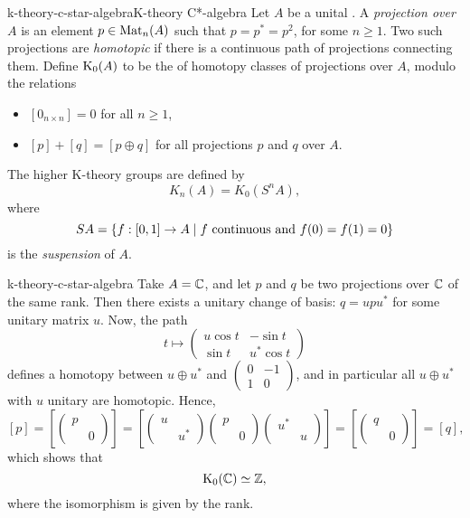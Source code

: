 \begin{topic}{k-theory-c-star-algebra}{K-theory C*-algebra}
    Let $A$ be a unital . A \textit{projection over $A$} is an element $p \in \textup{Mat}_n(A)$ such that $p = p^* = p^2$, for some $n \ge 1$. Two such projections are \textit{homotopic} if there is a continuous path of projections connecting them. Define $\textup{K}_0(A)$ to be the  of homotopy classes of projections over $A$, modulo the relations
    \begin{itemize}
        \item $[0_{n \times n}] = 0$ for all $n \ge 1$,
        \item $[p] + [q] = [p \oplus q]$ for all projections $p$ and $q$ over $A$.
    \end{itemize}
    The higher K-theory groups are defined by
    \[ K_n(A) = K_0(S^n A) , \]
    where
    \[ SA = \{ f : [0, 1] \to A \;|\; f \textup{ continuous and } f(0) = f(1) = 0 \} \]
    is the \textit{suspension} of $A$.
\end{topic}

\begin{example}{k-theory-c-star-algebra}
    Take $A = \mathbb{C}$, and let $p$ and $q$ be two projections over $\mathbb{C}$ of the same rank. Then there exists a unitary change of basis: $q = upu^*$ for some unitary matrix $u$. Now, the path
    \[ t \mapsto \begin{pmatrix} u \cos t & - \sin t \\ \sin t & u^* \cos t \end{pmatrix} \]
    defines a homotopy between $u \oplus u^*$ and $\left(\begin{smallmatrix} 0 & -1 \\ 1 & 0 \end{smallmatrix}\right)$, and in particular all $u \oplus u^*$ with $u$ unitary are homotopic. Hence,
    \[ [p] = \left[ \begin{pmatrix} p & \\ & 0 \end{pmatrix} \right] = \left[ \begin{pmatrix} u & \\ & u^* \end{pmatrix} \begin{pmatrix} p & \\ & 0 \end{pmatrix} \begin{pmatrix} u^* & \\ & u \end{pmatrix} \right] = \left[ \begin{pmatrix} q & \\ & 0 \end{pmatrix} \right] = [q] , \]
    which shows that
    \[ \textup{K}_0(\mathbb{C}) \simeq \mathbb{Z} , \]
    where the isomorphism is given by the rank.
\end{example}

